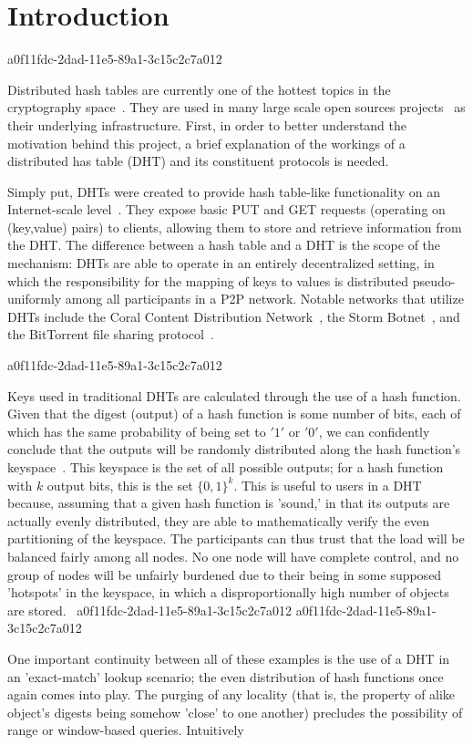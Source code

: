 \documentclass[12pt]{article}
\begin{document}
\section{Introduction}
a0f11fdc-2dad-11e5-89a1-3c15c2c7a012\par Distributed hash tables are currently one of the hottest topics in the cryptography space~\cite{Stoica:2001dj,Rowstron:2001ea,Ratnasamy:2001wn}. They are used in many large scale open sources projects~\cite{Freitas:2013tb,Xu:2010vs,Perfitt:2010fh} as their underlying infrastructure. First, in order to better understand the motivation behind this project, a brief explanation of the workings of a distributed has table (DHT) and its constituent protocols is needed.

\par Simply put, DHTs were created to provide hash table-like functionality on an Internet-scale level~\cite{Ratnasamy:2001wn}. They expose basic PUT and GET requests (operating on (key,value) pairs) to clients, allowing them to store and retrieve information from the DHT. The difference between a hash table and a DHT is the scope of the mechanism: DHTs are able to operate in an entirely decentralized setting, in which the responsibility for the mapping of keys to values is distributed pseudo-uniformly among all participants in a P2P network. Notable networks that utilize DHTs include the Coral Content Distribution Network~\cite{Freedman:2004vb}, the Storm Botnet~\cite{Holz:2008uk}, and the BitTorrent file sharing protocol~\cite{Cohen:y1_8mBnw}.

a0f11fdc-2dad-11e5-89a1-3c15c2c7a012\par Keys used in traditional DHTs are calculated through the use of a hash function. Given that the digest (output) of a hash function is some number of bits, each of which has the same probability of being set to $'1'$ or $'0'$, we can confidently conclude that the outputs will be randomly distributed along the hash function's keyspace~. This keyspace is the set of all possible outputs; for a hash function with $k$ output bits, this is the set $\{0,1\}^k$. This is useful to users in a DHT because, assuming that a given hash function is 'sound,' in that its outputs are actually evenly distributed, they are able to mathematically verify the even partitioning of the keyspace. The participants can thus trust that the load will be balanced fairly among all nodes. No one node will have complete control, and no group of nodes will be unfairly burdened due to their being in some supposed 'hotspots' in the keyspace, in which a disproportionally high number of objects are stored.~
a0f11fdc-2dad-11e5-89a1-3c15c2c7a012
a0f11fdc-2dad-11e5-89a1-3c15c2c7a012\par One important continuity between all of these examples is the use of a DHT in an 'exact-match' lookup scenario; the even distribution of hash functions once again comes into play. The purging of any locality (that is, the property of alike object's digests being somehow 'close' to one another) precludes the possibility of range or window-based queries. Intuitively
\end{document}
